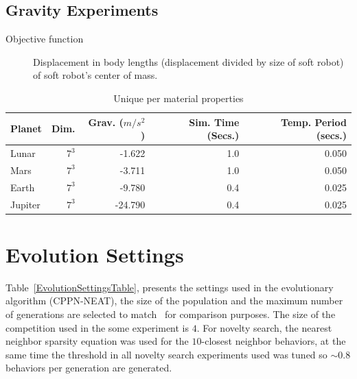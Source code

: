 \section{Gravity Experiments}
\label{gravitySettings}
\begin{small}
\begin{description}
\item[Objective function]{Displacement in body lengths (displacement divided by size of soft robot) of soft robot's center of mass.}
\end{description}
\end{small}
\begin{table}[ht!]
\centering
\caption{Unique per material properties}
\label{UniqueGravitySettings}
    \begin{tabular}{lrrrr}
    \toprule
    \textbf{Planet} & \textbf{Dim.} & \textbf{Grav.} ($m/s^2$) & \textbf{Sim. Time} (Secs.) & \textbf{Temp. Period} (secs.) \\
    \midrule
    Lunar & $7^3$ & -1.622 & 1.0 & 0.050 \\
    Mars & $7^3$ & -3.711 & 1.0 & 0.050 \\
    Earth & $7^3$ & -9.780 & 0.4 & 0.025 \\
    Jupiter & $7^3$ & -24.790 & 0.4 & 0.025\\
    \bottomrule
    \end{tabular}
\end{table}















\chapter{Evolution Settings} %
\label{EvolutionSettings} %


Table~\ref{EvolutionSettingsTable}, presents the settings used in the evolutionary algorithm (CPPN-NEAT), the size of the population and the maximum number of generations are selected to match~\cite{cheney2013unshackling} for comparison purposes. The size of the competition used in the some experiment is $4$. For novelty search, the nearest neighbor sparsity equation was used for the $10$-closest neighbor behaviors, at the same time the threshold in all novelty search experiments used was tuned so $\sim 0.8$ behaviors per generation are generated.

